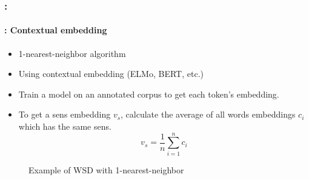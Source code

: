 \documentclass[xcolor=table]{beamer}
\begin{document}
\begin{frame}
	\frametitle{\insertshortsubtitle: \insertsection}
	\framesubtitle{\insertsubsection: Contextual embedding}

	\begin{minipage}{.68\textwidth}
	\begin{itemize}
		\item 1-nearest-neighbor algorithm
		\item Using contextual embedding (ELMo, BERT, etc.)
		\item Train a model on an annotated corpus to get each token's embedding.
		\item To get a sens embedding $v_s$, calculate the average of all words embeddings $c_i$ which has the same sens.
		\[ v_s = \frac{1}{n} \sum_{i=1}^{n} c_i \] 
	\end{itemize}
	\end{minipage}
	\begin{minipage}{.3\textwidth}
		\begin{figure}
			\caption{Example of WSD with 1-nearest-neighbor \cite{2019-jurafsky-martin}}
		\end{figure}
	\end{minipage}

\end{frame}

\end{document}
